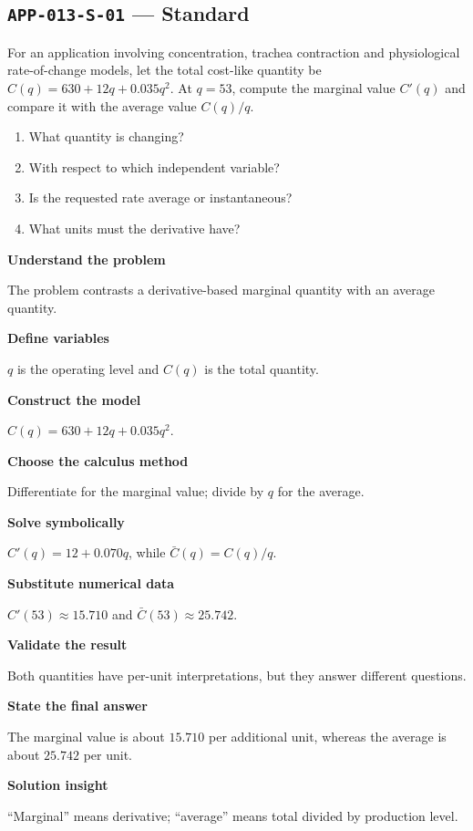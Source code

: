 \documentclass[11pt]{book}
\newcommand{\pid}[1]{\texttt{#1}}
\begin{document}
\subsection*{\pid{APP-013-S-01} — Standard}
\begin{problembox}
For an application involving concentration, trachea contraction and physiological rate-of-change models, let the total cost-like quantity be $C(q)=630+12q+0.035q^2$. At $q=53$, compute the marginal value $C'(q)$ and compare it with the average value $C(q)/q$.
\end{problembox}
\begin{promptbox}\begin{enumerate}
\item What quantity is changing?
\item With respect to which independent variable?
\item Is the requested rate average or instantaneous?
\item What units must the derivative have?
\end{enumerate}\end{promptbox}
\begin{solutionbox}
\textbf{Understand the problem}\par The problem contrasts a derivative-based marginal quantity with an average quantity.\par\medskip
\textbf{Define variables}\par $q$ is the operating level and $C(q)$ is the total quantity.\par\medskip
\textbf{Construct the model}\par $C(q)=630+12q+0.035q^2$.\par\medskip
\textbf{Choose the calculus method}\par Differentiate for the marginal value; divide by $q$ for the average.\par\medskip
\textbf{Solve symbolically}\par $C'(q)=12+0.070q$, while $\bar C(q)=C(q)/q$.\par\medskip
\textbf{Substitute numerical data}\par $C'(53)\approx 15.710$ and $\bar C(53)\approx 25.742$.\par\medskip
\textbf{Validate the result}\par Both quantities have per-unit interpretations, but they answer different questions.\par\medskip
\textbf{State the final answer}\par The marginal value is about $15.710$ per additional unit, whereas the average is about $25.742$ per unit.\par\medskip
\textbf{Solution insight}\par “Marginal” means derivative; “average” means total divided by production level.\par\medskip
\end{solutionbox}
\end{document}
